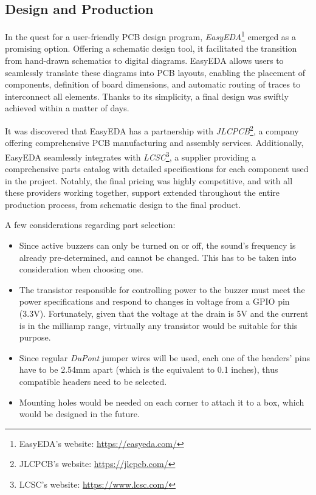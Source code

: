 \subsection{Design and Production}

In the quest for a user-friendly PCB design program, \textit{EasyEDA}\footnote{EasyEDA's website: 
\url{https://easyeda.com/}} emerged as a promising option. Offering a schematic design tool, it facilitated 
the transition from hand-drawn schematics to digital diagrams. EasyEDA allows users to seamlessly translate 
these diagrams into PCB layouts, enabling the placement of components, definition of board dimensions, and 
automatic routing of traces to interconnect all elements. Thanks to its simplicity, a final design was 
swiftly achieved within a matter of days.

It was discovered that EasyEDA has a partnership with \textit{JLCPCB}\footnote{JLCPCB's website: 
\url{https://jlcpcb.com/}}, a company offering comprehensive PCB manufacturing and assembly services. 
Additionally, EasyEDA seamlessly integrates with \textit{LCSC}\footnote{LCSC's website: 
\url{https://www.lcsc.com/}}, a supplier providing a comprehensive parts catalog with detailed specifications 
for each component used in the project. Notably, the final pricing was highly competitive, and with all these 
providers working together, support extended throughout the entire production process, from schematic design 
to the final product.

A few considerations regarding part selection:
\begin{itemize}
    \item Since active buzzers can only be turned on or off, the sound's frequency is already pre-determined, 
    and cannot be changed. This has to be taken into consideration when choosing one.
    \item The transistor responsible for controlling power to the buzzer must meet the power specifications 
    and respond to changes in voltage from a GPIO pin (3.3V). Fortunately, given that the voltage at the 
    drain is 5V and the current is in the milliamp range, virtually any transistor would be suitable for 
    this purpose.
    \item Since regular \textit{DuPont} jumper wires will be used, each one of the headers' pins have to be 
    2.54mm apart (which is the equivalent to 0.1 inches), thus compatible headers need to be selected.
    \item Mounting holes would be needed on each corner to attach it to a box, which would be designed in 
    the future.
\end{itemize}

